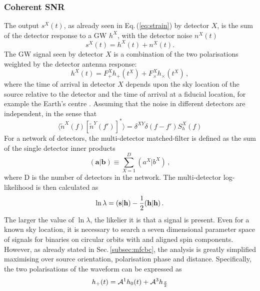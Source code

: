 \documentclass[binding=0.6cm, LaM]{sapthesis}
\begin{document}
\subsubsection{Coherent SNR}	
	The output $s^X(t)$, as already seen in Eq.\,(\ref{eq:strain}) by detector $X$,
	is the sum of the detector response to a GW $h^X$,
	with the detector noise $n^X(t)$
        \begin{equation}
          s^X(t) = h^X(t) + n^X(t).
        \end{equation}
	The GW signal seen by detector $X$ is a combination of
        the two polarisations weighted by the detector antenna
        response:
        \begin{equation}
          \label{eq:gwsignal}
          h^X(t) = F_{+}^X h_{+}(t^X) + F_{\times}^X h_{\times}(t^X)\,, 
        \end{equation}
        where the time of arrival in detector $X$ depends upon the sky location
        of the source relative to the detector and the time of arrival at a fiducial location,
        for example the Earth’s centre \cite{45}.
	Assuming that the noise in different detectors are independent, in the sense that 
        \begin{equation}
          \langle \tilde{n}^X(f)[ \tilde{n}^Y(f')]^*\rangle = \delta^{XY}\delta(f-f')S_h^X(f)
        \end{equation}
        For a network of detectors, the multi-detector matched-filter
        is defined as the sum of the single detector inner products
        \begin{equation}
          (\textbf{a}|\textbf{b}) \equiv \sum^D_{X=1} (a^X|b^X)\,,
        \end{equation}
        where D is the number of detectors in the network. The multi-detector log-likelihood is then calculated as
        \begin{equation}
          \ln \lambda = (\textbf{s}|\textbf{h}) - {1 \over 2} (\textbf{h}|\textbf{h})\,.
        \end{equation}
        The larger the value of $\ln \lambda$, the likelier it is that a signal is present.
	Even for a known sky location, it is necessary to search a seven 
	dimensional parameter space of signals for binaries on circular orbits with and aligned spin components.
	However, as already stated in Sec.\,\ref{subsec:mfcbc}, the analysis is greatly simplified 
	maximising over source orientation, polarisation phase and distance.
	Specifically, the two polarisations of the waveform can be expressed as 
        \begin{equation}
          h_+(t) = \mathcal{A}^1h_0(t) + \mathcal{A}^3h_{{{\pi} \over {2}}}
        \end{equation}		
\end{document}

